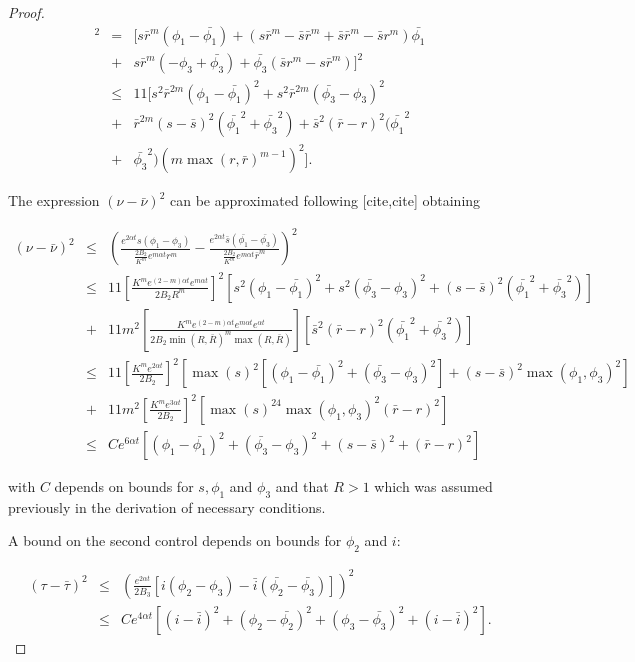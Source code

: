 \begin{proof}
\begin{eqnarray*}
	[s\bar{r}^m(\phi_1-\phi_3)-\bar{s}r^m(\bar{\phi_1}-\bar{\phi_3})]^2&=&[s\bar{r}^m(\phi_1-\bar{\phi_1})+(s\bar{r}^m-\bar{s}\bar{r}^m+\bar{s}\bar{r}^m-\bar{s}r^m)\bar{\phi_1}\\
	&+&s\bar{r}^m(-\phi_3+\bar{\phi_3})+\bar{\phi_3}(\bar{s}r^m-s\bar{r}^m)]^2\\
	&\leq&11[s^2\bar{r}^{2m}(\phi_1-\bar{\phi_1})^2+s^2\bar{r}^{2m}(\bar{\phi_3}-\phi_3)^2\\
	&+&\bar{r}^{2m}(s-\bar{s})^2(\bar{\phi_1}^2+\bar{\phi_3}^2)+\bar{s}^2(\bar{r}-r)^2(\bar{\phi_1}^2\\
	&+&\bar{\phi_3}^2)(m \max(r,\bar{r})^{m-1})^2].
\end{eqnarray*}	
	
The expression $(\nu-\bar{\nu})^2$ can be approximated following [cite,cite] 
obtaining

\begin{eqnarray}
	(\nu-\bar{\nu})^2&\leq&\left(\frac{e^{2\alpha 
	t}s(\phi_1-\phi_3)}{\frac{2B_2}{K^m}e^{m\alpha t}r^m}-\frac{e^{2\alpha 
	t}\bar{s}(\bar{\phi_1}-\bar{\phi_3})}{\frac{2B_2}{K^m}e^{m\alpha 
	t}\bar{r}^m}\right)^2\nonumber\\
	&\leq& 11\left[\frac{K^me^{(2-m)\alpha t}e^{m\alpha 
	t}}{2B_2R^m}\right]^2[s^2(\phi_1-\bar{\phi_1})^2+s^2(\bar{\phi_3}-\phi_3)^2+(s-\bar{s})^2(\bar{\phi_1}^2+\bar{\phi_3}^2)]\nonumber\\
	&+&11m^2\left[\frac{K^me^{(2-m)\alpha t}e^{m\alpha t}e^{\alpha 
	t}}{2B_2\min(R,\bar{R})^m\max(R,\bar{R})}\right][\bar{s}^2(\bar{r}-r)^2(\bar{\phi_1}^2+\bar{\phi_3}^2)]\nonumber\\
	&\leq&11\left[\frac{K^me^{2\alpha 
	t}}{2B_2}\right]^2[\max(s)^2[(\phi_1-\bar{\phi_1})^2+(\bar{\phi_3}-\phi_3)^2]+(s-\bar{s})^2\max(\phi_1,\phi_3)^2]\nonumber\\
	&+& 11m^2\left[\frac{K^me^{3\alpha 
	t}}{2B_2}\right]^2[\max(s)^24\max(\phi_1,\phi_3)^2(\bar{r}-r)^2]\nonumber\\
	&\leq& Ce^{6\alpha 
	t}[(\phi_1-\bar{\phi_1})^2+(\bar{\phi_3}-\phi_3)^2+(s-\bar{s})^2+(\bar{r}-r)^2]\label{eq.1.4.46}
\end{eqnarray}

with $C$ depends on bounds for $s,\phi_1$ and $\phi_3$ and that $R>1$ which was 
assumed previously in the derivation of necessary conditions.

A bound on the second control depends on bounds for $\phi_2$ and $i$:

\begin{eqnarray}
(\tau-\bar{\tau})^2&\leq&\left(\frac{e^{2\alpha 
t}}{2B_3}[i(\phi_2-\phi_3)-\bar{i}(\bar{\phi_2}-\bar{\phi_3})]\right)^2\nonumber\\
&\leq& Ce^{4\alpha 
t}[(i-\bar{i})^2+(\phi_2-\bar{\phi_2})^2+(\phi_3-\bar{\phi_3})^2+(i-\bar{i})^2].\label{eq.1.4.47}
\end{eqnarray}


\end{proof}
